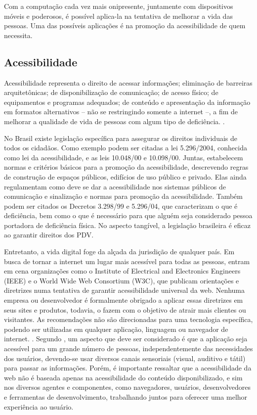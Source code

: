 \documentclass[twoside,english,brazilian]{UNISINOSartigo}
\begin{document}
Com a computação cada vez mais onipresente, juntamente com dispositivos móveis e poderosos, é possível aplica-la na tentativa de melhorar a vida das pessoas. Uma das possíveis aplicações é na promoção da acessibilidade de quem necessita. 

\subsection{Acessibilidade}
Acessibilidade representa o direito de acessar informações; eliminação de barreiras arquitetônicas; de disponibilização de comunicação; de acesso físico; de equipamentos e programas adequados; de conteúdo e apresentação da informação em formatos alternativos – não se restringindo somente a internet –, a fim de melhorar a qualidade de vida de pessoas com algum tipo de deficiência. \cite{AcessibilidadeBrasil}. 

No Brasil existe legislação específica para assegurar os direitos individuais de todos os cidadãos. Como exemplo podem ser citadas a lei 5.296/2004, conhecida como lei da acessibilidade, e as leis 10.048/00 e 10.098/00. Juntas, estabelecem normas e critérios básicos para a promoção da acessibilidade, descrevendo regras de construção de espaços públicos, edifícios de uso público e privado. Elas ainda regulamentam como deve se dar a acessibilidade nos sistemas públicos de comunicação e sinalização e normas para promoção da acessibilidade. Também podem ser citados os Decretos 3.298/99 e 5.296/04, que caracterizam o que é deficiência, bem como o que é necessário para que alguém seja considerado pessoa portadora de deficiência física. No aspecto tangível, a legislação brasileira é eficaz ao garantir direitos dos PDV.

Entretanto, a vida digital foge da alçada da jurisdição de qualquer país. Em busca de tornar a internet um lugar mais acessível para todas as pessoas, entram em cena organizações como o Institute of Electrical and Electronics Engineers (IEEE) e o World Wide Web Consortium (W3C), que publicam orientações e diretrizes numa tentativa de garantir acessibilidade universal da web. Nenhuma empresa ou desenvolvedor é formalmente obrigado a aplicar essas diretrizes em seus sites e produtos, todavia, o fazem com o objetivo de atrair mais clientes ou visitantes. As recomendações não são direcionadas para uma tecnologia específica, podendo ser utilizadas em qualquer aplicação, linguagem ou navegador de internet. \cite{W3Cguideliness}. Segundo , um aspecto que deve ser considerado é que a aplicação seja acessível para um grande número de pessoas, independentemente das necessidades dos usuários, devendo-se usar diversos canais sensoriais (visual, auditivo e tátil) para passar as informações. Porém, é importante ressaltar que a acessibilidade da web não é baseada apenas na acessibilidade do conteúdo disponibilizado, e sim nos diversos agentes e componentes, como navegadores, usuários, desenvolvedores e ferramentas de desenvolvimento, trabalhando juntos para oferecer uma melhor experiência ao usuário.
\end{document}
